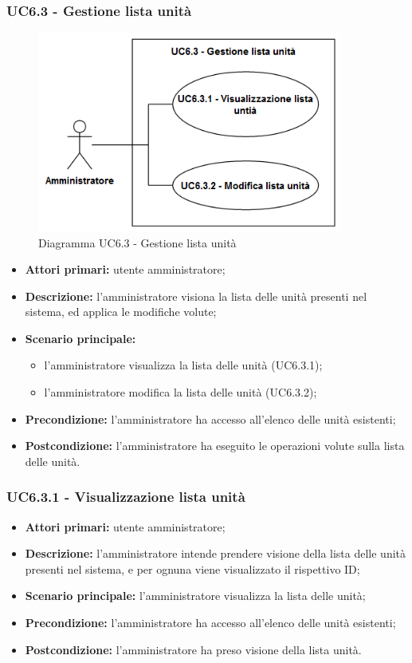 \subsubsection{UC6.3 - Gestione lista unità}
	\begin{figure}[H]
		\centering
		\includegraphics[width=10cm]{images/UC6.3.png}
		\caption{Diagramma UC6.3 - Gestione lista unità}
	\end{figure}
	\begin{itemize}
		\item \textbf{Attori primari:} utente amministratore;
		\item \textbf{Descrizione:} l'amministratore visiona la lista delle unità presenti nel sistema, ed applica le modifiche volute;
		\item \textbf{Scenario principale:} 
			\begin{itemize}
				\item l'amministratore visualizza la lista delle unità (UC6.3.1);
				\item l'amministratore modifica la lista delle unità (UC6.3.2);
			\end{itemize}
		\item \textbf{Precondizione:} l'amministratore ha accesso all'elenco delle unità esistenti;
		\item \textbf{Postcondizione:} l'amministratore ha eseguito le operazioni volute sulla lista delle unità.
	\end{itemize}

\subsubsection{UC6.3.1 - Visualizzazione lista unità}
\begin{itemize}
	\item \textbf{Attori primari:} utente amministratore;
	\item \textbf{Descrizione:} l'amministratore intende prendere visione della lista delle unità presenti nel sistema, e per ognuna viene visualizzato il rispettivo ID;
	\item \textbf{Scenario principale:} l'amministratore visualizza la lista delle unità;
	\item \textbf{Precondizione:} l'amministratore ha accesso all'elenco delle unità esistenti;
	\item \textbf{Postcondizione:} l'amministratore ha preso visione della lista unità.
\end{itemize}

